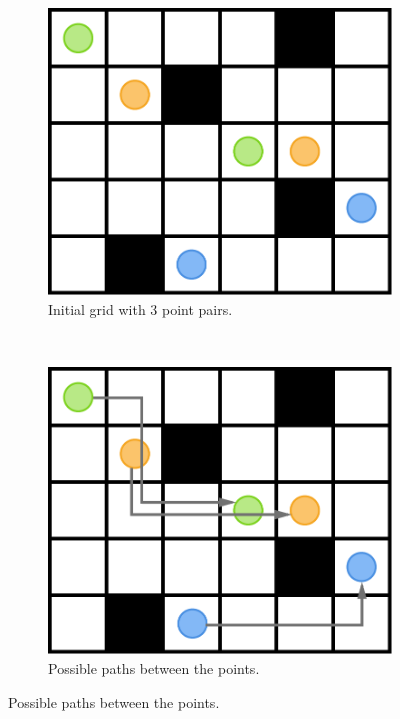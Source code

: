 \begin{figure}[b]
    \begin{subfigure}[t]{.24\textwidth}
        \includegraphics[width=\textwidth,keepaspectratio]{gfx/preliminaries-labyrinth/1-maze_points}
        \caption{Initial grid with 3 point pairs.}%
    \end{subfigure}%
    ~
    \begin{subfigure}[t]{.24\textwidth}
        \includegraphics[width=\textwidth,keepaspectratio]{gfx/preliminaries-labyrinth/2-maze_paths}
        \caption{Possible paths between the points.}%

\end{subfigure}
\end{figure}
